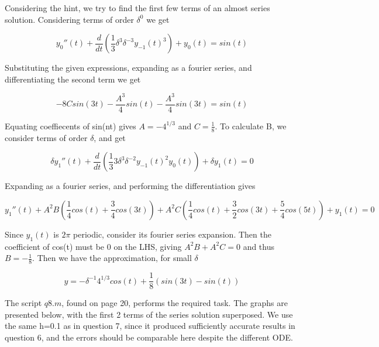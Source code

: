 \documentclass[10pt,a4paper]{report}
\begin{document}
Considering the hint, we try to find the first few terms of an almost series solution. Considering terms of order $\delta^0$ we get

\begin{equation*}
y_0''(t)+\frac{d}{dt}(\frac{1}{3}\delta^3\delta^{-3}y_{-1}(t)^3)+y_0(t)=sin(t)
\end{equation*}

Substituting the given expressions, expanding as a fourier series, and differentiating the second term we get

\begin{equation*}
-8Csin(3t)-\frac{A^3}{4}sin(t)-\frac{A^3}{4}sin(3t)=sin(t)
\end{equation*}

Equating coeffiecents of sin(nt) gives $A=-4^{1/3}$ and $C=\frac{1}{8}$. To calculate B, we consider terms of order $\delta$, and get

\begin{equation*}
\delta y_1''(t)+\frac{d}{dt}(\frac{1}{3}3\delta^3\delta^{-2}y_{-1}(t)^2y_0(t))+\delta y_1(t)=0
\end{equation*}

Expanding as a fourier series, and performing the differentiation gives

\begin{equation*}
y_1''(t)+A^2B(\frac{1}{4}cos(t)+\frac{3}{4}cos(3t))+A^2C(\frac{1}{4}cos(t)+\frac{3}{2}cos(3t)+\frac{5}{4}cos(5t)) +y_1(t)=0
\end{equation*}

Since $y_1(t)$ is $2\pi$ periodic, consider its fourier series expansion. Then the coefficient of cos(t) must be 0 on the LHS, giving $A^2B+A^2C=0$ and thus $B=-\frac{1}{8}$. Then we have the approximation, for small $\delta$ 

\begin{equation*}
y=-\delta^{-1}4^{1/3}cos(t)+\frac{1}{8}(sin(3t)-sin(t))
\end{equation*}
	

The script $q8.m$, found on page 20, performs the required task. The graphs are presented below, with the first 2 terms of the series solution superposed. We use the same h=0.1 as in question 7, since it produced sufficiently accurate results in question 6, and the errors should be comparable here despite the different ODE.
\end{document}
